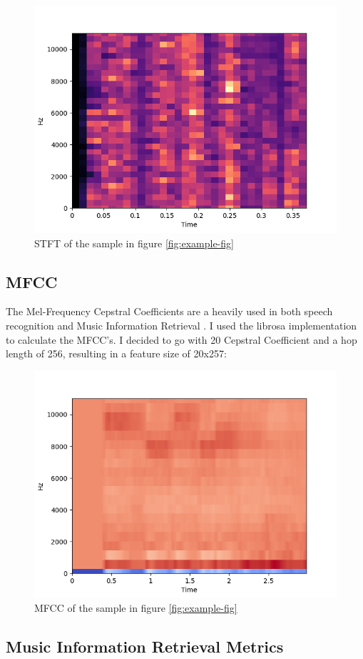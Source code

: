 \documentclass[a4paper, 12pt, twoside]{report}
\begin{document}
\begin{figure}[h!]
\centering
\includegraphics[width=.7\linewidth]{./Figures/stft.png}
\caption{STFT of the sample in figure \ref{fig:example-fig}}
\end{figure}

\subsection{MFCC}
\label{sec:org70aa9fd}

The Mel-Frequency Cepstral Coefficients are a heavily used in both speech recognition and Music Information Retrieval \cite{medium,klustr,Racharla_2020,article}.
I used the librosa implementation to calculate the MFCC's. I decided to go with 20 Cepstral Coefficient and a hop length of 256, resulting in a feature size of 20x257:

\begin{figure}[h!]
\centering
\includegraphics[width=.7\linewidth]{./Figures/mfcc.png}
\caption{\label{fig:mfcc}MFCC of the sample in figure \ref{fig:example-fig}}
\end{figure}

\subsection{Music Information Retrieval Metrics}
\label{sec:orgb3249b0}
\end{document}
